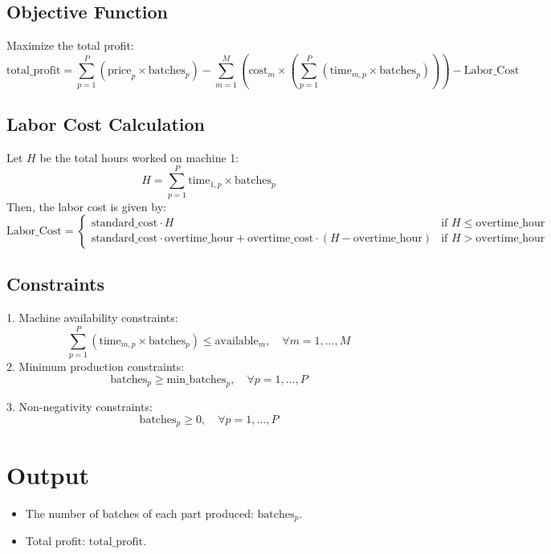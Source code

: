 \documentclass{article}
\begin{document}
\subsection*{Objective Function}
Maximize the total profit:
\[
\text{total\_profit} = \sum_{p=1}^{P} \left( \text{price}_{p} \times \text{batches}_{p} \right) - \sum_{m=1}^{M} \left( \text{cost}_{m} \times \left( \sum_{p=1}^{P} \left( \text{time}_{m,p} \times \text{batches}_{p} \right) \right) \right) - \text{Labor\_Cost}
\]

\subsection*{Labor Cost Calculation}
Let \( H \) be the total hours worked on machine 1:
\[
H = \sum_{p=1}^{P} \text{time}_{1,p} \times \text{batches}_{p}
\]
Then, the labor cost is given by:
\[
\text{Labor\_Cost} = 
\begin{cases} 
\text{standard\_cost} \cdot H & \text{if } H \leq \text{overtime\_hour} \\
\text{standard\_cost} \cdot \text{overtime\_hour} + \text{overtime\_cost} \cdot (H - \text{overtime\_hour}) & \text{if } H > \text{overtime\_hour}
\end{cases}
\]

\subsection*{Constraints}
1. Machine availability constraints:
\[
\sum_{p=1}^{P} \left( \text{time}_{m,p} \times \text{batches}_{p} \right) \leq \text{available}_{m}, \quad \forall m = 1, \ldots, M
\]
2. Minimum production constraints:
\[
\text{batches}_{p} \geq \text{min\_batches}_{p}, \quad \forall p = 1, \ldots, P
\]

3. Non-negativity constraints:
\[
\text{batches}_{p} \geq 0, \quad \forall p = 1, \ldots, P
\]

\section*{Output}
\begin{itemize}
    \item The number of batches of each part produced: \( \text{batches}_{p} \).
    \item Total profit: \( \text{total\_profit} \).
\end{itemize}
\end{document}

